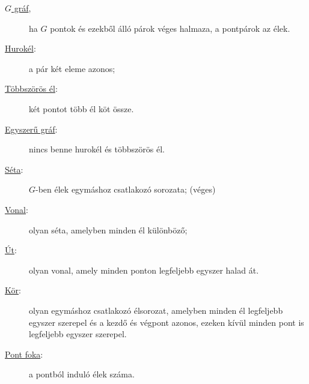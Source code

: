 \begin{description}
\item[\underline{$G$ gráf},] ha $G$ pontok és ezekből álló párok véges halmaza, a pontpárok az élek.

\item[\underline{Hurokél}:] a pár két eleme azonos;

\item[\underline{Többszörös él}:]
két pontot több él köt össze.

\item[\underline{Egyszerű gráf}:] nincs benne hurokél és többszörös él.

\item[\underline{Séta}:] $G$-ben élek egymáshoz csatlakozó sorozata; (véges)

\item[\underline{Vonal}:] olyan séta, amelyben minden él különböző;

\item[\underline{Út}:] olyan vonal, amely minden ponton legfeljebb egyszer halad át.

\item[\underline{Kör}:] olyan egymáshoz csatlakozó élsorozat, amelyben minden él legfeljebb egyszer szerepel és a kezdő és végpont azonos, ezeken kívül minden pont is legfeljebb egyszer szerepel.

\item[\underline{Pont foka}:] a pontból induló élek száma.

\end{description}

